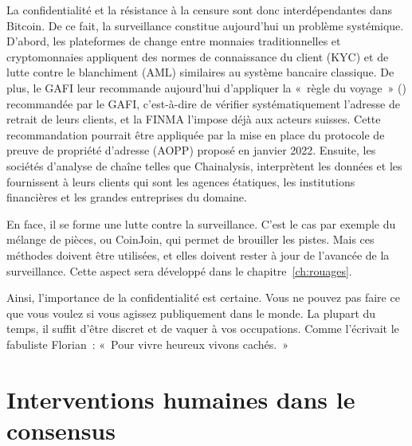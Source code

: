 La confidentialité et la résistance à la censure sont donc interdépendantes dans Bitcoin. De ce fait, la surveillance constitue aujourd'hui un problème systémique. D'abord, les plateformes de change entre monnaies traditionnelles et cryptomonnaies appliquent des normes de connaissance du client (KYC) et de lutte contre le blanchiment (AML) similaires au système bancaire classique. De plus, le GAFI leur recommande aujourd'hui d'appliquer la «~règle du voyage~» ()  recommandée par le GAFI, c'est-à-dire de vérifier systématiquement l'adresse de retrait de leurs clients, et la FINMA l'impose déjà aux acteurs suisses. Cette recommandation pourrait être appliquée par la mise en place du protocole de preuve de propriété d'adresse (AOPP) proposé en janvier 2022. Ensuite, les sociétés d'analyse de chaîne telles que Chainalysis, interprètent les données et les fournissent à leurs clients qui sont les agences étatiques, les institutions financières et les grandes entreprises du domaine.

En face, il se forme une lutte contre la surveillance. C'est le cas par exemple du mélange de pièces, ou CoinJoin, qui permet de brouiller les pistes. Mais ces méthodes doivent être utilisées, et elles doivent rester à jour de l'avancée de la surveillance. Cette aspect sera développé dans le chapitre~\ref{ch:rouages}.

Ainsi, l'importance de la confidentialité est certaine. Vous ne pouvez pas faire ce que vous voulez si vous agissez publiquement dans le monde. La plupart du temps, il suffit d'être discret et de vaquer à vos occupations. Comme l'écrivait le fabuliste Florian~: «~Pour vivre heureux vivons cachés.~»

\section*{Interventions humaines dans le consensus}

